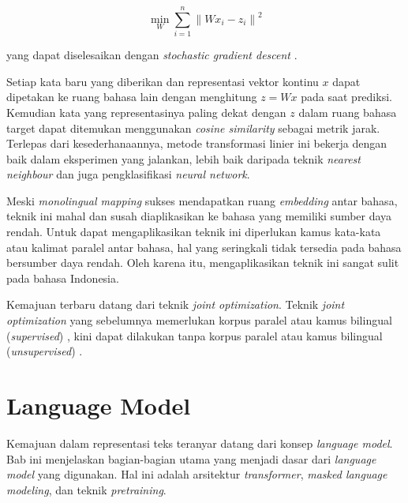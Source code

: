     \begin{equation}
        \min_{W}\sum_{i=1}^{n}\left \| Wx_i-z_i \right \|^2
        \label{eq:2}
    \end{equation}

    yang dapat diselesaikan dengan \textit{stochastic gradient descent} \parencite{MikolovExploiting}.

    Setiap kata baru yang diberikan dan representasi vektor kontinu \(x\) dapat dipetakan ke ruang bahasa lain dengan menghitung \(z = W x\) pada saat prediksi. Kemudian kata yang representasinya paling dekat dengan \(z\) dalam ruang bahasa target dapat ditemukan menggunakan \textit{cosine similarity} sebagai metrik jarak. Terlepas dari kesederhanaannya, metode transformasi linier ini bekerja dengan baik dalam eksperimen yang \parencite{MikolovExploiting} jalankan, lebih baik daripada teknik \textit{nearest neighbour} dan juga pengklasifikasi \textit{neural network}.

    Meski \textit{monolingual mapping} sukses mendapatkan ruang \textit{embedding} antar bahasa, teknik ini mahal dan susah diaplikasikan ke bahasa yang memiliki sumber daya rendah. Untuk dapat mengaplikasikan teknik ini diperlukan kamus kata-kata atau kalimat paralel antar bahasa, hal yang seringkali tidak tersedia pada bahasa bersumber daya rendah. Oleh karena itu, mengaplikasikan teknik ini sangat sulit pada bahasa Indonesia. 

    Kemajuan terbaru datang dari teknik \textit{joint optimization}. Teknik \textit{joint optimization} yang sebelumnya memerlukan korpus paralel atau kamus bilingual (\textit{supervised}) \parencite{Xing_Wang_Liu_Lin}, kini dapat dilakukan tanpa korpus paralel atau kamus bilingual (\textit{unsupervised}) \parencite{Devlin_Chang_Lee_Toutanova_2019} \parencite{LampleConneau2019}. 

\section{Language Model}
    Kemajuan dalam representasi teks teranyar datang dari konsep \textit{language model}. Bab ini menjelaskan bagian-bagian utama yang menjadi dasar dari \textit{language model} yang digunakan. Hal ini adalah  arsitektur \textit{transformer}, \textit{masked language modeling}, dan teknik \textit{pretraining}.

